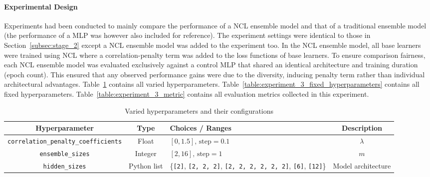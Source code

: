 \paragraph{Experimental Design}
Experiments had been conducted to mainly compare the performance of a NCL ensemble model and that of a traditional ensemble model (the performance of a MLP was however also included for reference). The experiment settings were identical to those in Section~\ref{subsec:stage_2} except a NCL ensemble model was added to the experiment too. In the NCL ensemble model, all base learners were trained using NCL where a correlation-penalty term was added to the loss functions of base learners. To ensure comparison fairness, each NCL ensemble model was evaluated exclusively against a control MLP that shared an identical architecture and training duration (epoch count). This ensured that any observed performance gains were due to the diversity, inducing penalty term rather than individual architectural advantages. Table~\ref{table:experiment_3_varied_hyperparameters} contains all varied hyperparameters. Table~\ref{table:experiment_3_fixed_hyperparameters} contains all fixed hyperparameters. Table~\ref{table:experiment_3_metric} contains all evaluation metrics collected in this experiment. 

\begin{table}[H]
    \centering
    \begin{tabular}{|c|c|p{4cm}|c|}
        \hline
        Hyperparameter & Type & Choices / Ranges & Description \\
        \hline
        \small\texttt{correlation\_penalty\_coefficients} & Float & $[0, 1.5]\text{, step}=0.1$ & $\lambda$ \\
        \hline
        \small\texttt{ensemble\_sizes} & Integer & $[2, 16]\text{, step}=1$ & $m$ \\
        \hline
        \small\texttt{hidden\_sizes} & Python list & \{\texttt{[2]}, \texttt{[2, 2, 2]}, \texttt{[2, 2, 2, 2, 2, 2]}, \texttt{[6]}, \texttt{[12]}\} & Model architecture \\
        \hline
    \end{tabular}
    \caption{Varied hyperparameters and their configurations}
    \label{table:experiment_3_varied_hyperparameters}
\end{table}

